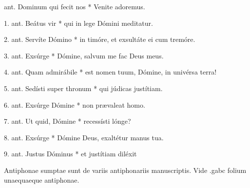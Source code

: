 



%

\begin{center}

\end{center}


ant. Dominum qui fecit nos * Venite adoremus.



1. ant. Beátus vir * qui in lege Dómini meditatur.


2. ant. Servíte Dómino * in timóre, et exsultáte ei cum tremóre.


3. ant. Exsúrge * Dómine, salvum me fac Deus meus.


4. ant. Quam admirábile * est nomen tuum, Dómine, in univérsa terra!

5. ant. Sedísti super thronum * qui júdicas justítiam.
 
6. ant. Exsúrge Dómine * non prævaleat homo.



7. ant. Ut quid, Dómine * recessísti lónge?

8. ant. Exsúrge * Dómine Deus, exaltétur manus tua.

9. ant. Justus Dóminus * et justítiam diléxit


\vspace{1cm}
\small{Antiphonae sumptae sunt de variis antiphonariis manuscriptis.
Vide .gabc folium unaequaeque antiphonae.}


